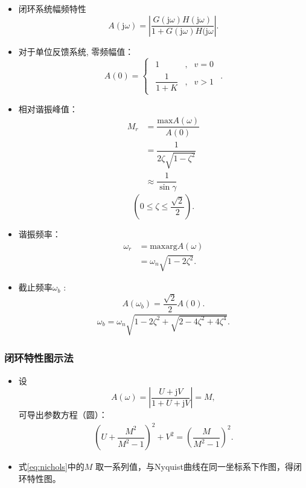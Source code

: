 \documentclass[14pt,a4paper]{article}
\theoremstyle{plain}
\theoremstyle{definition}
\theoremstyle{remark}
\theoremstyle{plain}
\theoremstyle{plain}
\theoremstyle{plain}
\theoremstyle{definition}
\theoremstyle{remark}
\numberwithin{equation}{section}
\begin{document}
			\begin{itemize}
				\item 闭环系统幅频特性
					\[
						A(\mathrm{j} \omega) = \left| \dfrac{G(\mathrm{j} \omega)H(\mathrm{j} \omega)}{1+G(\mathrm{j} \omega)H(\mathrm{j}\omega} \right|  
					.\]
				\item 对于单位反馈系统, 零频幅值：
					\begin{equation}
					\label{eq:A0}
					A(0) = 
					\begin{cases}
					\begin{aligned}
						1 &,& v=0 \\
						\dfrac{1}{1+K} &,& v>1
					\end{aligned}  
					\end{cases}
					.\end{equation} 
				\item 相对谐振峰值：
				\begin{align}
					M_r &= \dfrac{\text{max} A(\omega)}{A(0)} \nonumber \\
					&= \dfrac{1}{2\zeta \sqrt{1-\zeta^2} }\\
					& \approx \dfrac{1}{\sin\gamma}
				\end{align} 
				\[
					\left(0\le \zeta \le \dfrac{\sqrt{2}}{2} \right) 
				.\] 
				\item 谐振频率：
					\begin{align}
						\omega_r& = \text{maxarg} A(\omega)\nonumber \\
							&= \omega_{n} \sqrt{1-2\zeta^2} 
					.\end{align}  
				\item 截止频率$\omega_b$ :
					\[
						A(\omega_b) = \dfrac{\sqrt{2}}{2}A(0)  
					.\]
					\begin{align} 
						\label{eq:wb}
						\omega_b = \omega_n\sqrt{1-2\zeta^2+\sqrt{2-4\zeta^2+4\zeta^4}} 
					.\end{align}  
			\end{itemize}

			\subsubsection{闭环特性图示法}%
			\label{ssub:闭环特性图示法}
			
			\begin{itemize}
				\item 设
					\[
						A(\omega) = \left| \dfrac{U+\mathrm{j} V}{1+U+\mathrm{j} V} \right| = M
					,\] 
					可导出参数方程（圆）：
					\begin{align}
						\label{eq:nichols}
						\left( U+\dfrac{M^2}{M^2-1} \right) ^2 + V^2 = \left( \dfrac{M}{M^2-1} \right)^2
					.\end{align} 
				\item 式\eqref{eq:nichols}中的$M$ 取一系列值，与Nyquist曲线在同一坐标系下作图，得闭环特性图。 
			\end{itemize} 
\end{document}
